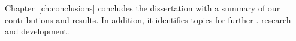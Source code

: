 Chapter~\ref{ch:conclusions} concludes the dissertation with a summary of our 
contributions and results. In addition, it identifies topics for further .
research and development.
%
%
%
%

